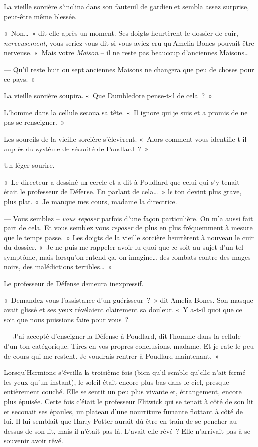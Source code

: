 La vieille sorcière s'inclina dans son fauteuil de gardien et sembla assez surprise, peut-être même blessée.

«~Non…~» dit-elle après un moment. Ses doigts heurtèrent le dossier de cuir, \emph{nerveusement}, vous seriez-vous dit si vous aviez cru qu'Amelia Bones pouvait être nerveuse. «~Mais votre \emph{Maison} -- il ne reste pas beaucoup d'anciennes Maisons…

--- Qu'il reste huit ou sept anciennes Maisons ne changera que peu de choses pour ce pays.~»

La vieille sorcière soupira. «~Que Dumbledore pense-t-il de cela~?~»

L'homme dans la cellule secoua sa tête. «~Il ignore qui je suis et a promis de ne pas se renseigner.~»

Les sourcils de la vieille sorcière s'élevèrent. «~Alors comment vous identifie-t-il auprès du système de sécurité de Poudlard~?~»

Un léger sourire.

«~Le directeur a dessiné un cercle et a dit à Poudlard que celui qui s'y tenait était le professeur de Défense. En parlant de cela…~» le ton devint plus grave, plus plat. «~Je manque mes cours, madame la directrice.

--- Vous semblez -- \emph{vous reposer} parfois d'une façon particulière. On m'a aussi fait part de cela. Et vous semblez vous \emph{reposer} de plus en plus fréquemment à mesure que le temps passe.~» Les doigts de la vieille sorcière heurtèrent à nouveau le cuir du dossier. «~Je ne puis me rappeler avoir lu quoi que ce soit au sujet d'un tel symptôme, mais lorsqu'on entend ça, on imagine… des combats contre des mages noirs, des malédictions terribles…~»

Le professeur de Défense demeura inexpressif.

«~Demandez-vous l'assistance d'un guérisseur~?~» dit Amelia Bones. Son masque avait glissé et ses yeux révélaient clairement sa douleur. «~Y a-t-il quoi que ce soit que nous puissions faire pour vous~?

--- J'ai accepté d'enseigner la Défense à Poudlard, dit l'homme dans la cellule d'un ton catégorique. Tirez-en vos propres conclusions, madame. Et je rate le peu de cours qui me restent. Je voudrais rentrer à Poudlard maintenant.~»

\later

Lorsqu'Hermione s'éveilla la troisième fois (bien qu'il semble qu'elle n'ait fermé les yeux qu'un instant), le soleil était encore plus bas dans le ciel, presque entièrement couché. Elle se sentit un peu plus vivante et, étrangement, encore plus épuisée. Cette fois c'était le professeur Flitwick qui se tenait à côté de son lit et secouait ses épaules, un plateau d'une nourriture fumante flottant à côté de lui. Il lui semblait que Harry Potter aurait dû être en train de se pencher au-dessus de son lit, mais il n'était pas là. L'avait-elle rêvé~? Elle n'arrivait pas à se souvenir avoir rêvé.

